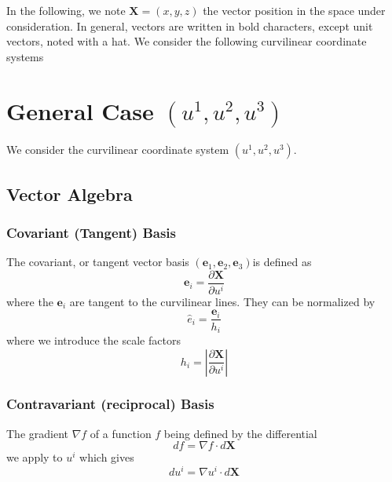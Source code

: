                       

\label{curvilinear}In the following, we note $\mathbf{X}=\left( x,y,z\right) 
$ the vector position in the space under consideration. In general, vectors
are written in bold characters, except unit vectors, noted with a hat. We
consider the following curvilinear coordinate systems

\section{General Case $(u^{1},u^{2},u^{3})$}

We consider the curvilinear coordinate system $(u^{1},u^{2},u^{3})$.

\subsection{Vector Algebra}

\subsubsection{Covariant (Tangent) Basis}

The covariant, or tangent vector basis $(\mathbf{e}_{1},\mathbf{e}_{2},%
\mathbf{e}_{3}) $is defined as 
\begin{equation}
\mathbf{e}_{i}=\frac{\partial\mathbf{X}}{\partial u^{i}}  \label{cov}
\end{equation}
where the $\mathbf{e}_{i}$ are tangent to the curvilinear lines. They can be
normalized by 
\begin{equation}
\widehat{e}_{i}=\frac{\mathbf{e}_{i}}{h_{i}}
\end{equation}
where we introduce the scale factors 
\begin{equation}
h_{i}=\left| \frac{\partial\mathbf{X}}{\partial u^{i}}\right|
\end{equation}

\subsubsection{Contravariant (reciprocal) Basis}

The gradient $\nabla f$ of a function $f$ being defined by the differential 
\begin{equation}
df=\nabla f\cdot d\mathbf{X}
\end{equation}
we apply to $u^{i}$ which gives 
\begin{equation}
du^{i}=\nabla u^{i}\cdot d\mathbf{X}
\end{equation}

